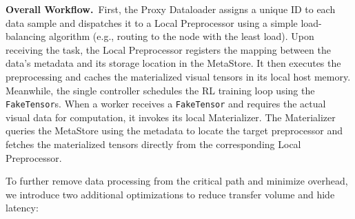 \noindent\textbf{Overall Workflow.}~First, the Proxy Dataloader assigns a unique ID to each data sample and dispatches it to a Local Preprocessor using a simple load-balancing algorithm (e.g., routing to the node with the least load). Upon receiving the task, the Local Preprocessor registers the mapping between the data's metadata and its storage location in the MetaStore. It then executes the preprocessing and caches the materialized visual tensors in its local host memory. Meanwhile, the single controller schedules the RL training loop using the \texttt{FakeTensor}s. When a worker receives a \texttt{FakeTensor} and requires the actual visual data for computation, it invokes its local Materializer. The Materializer queries the MetaStore using the metadata to locate the target preprocessor and fetches the materialized tensors directly from the corresponding Local Preprocessor.


To further remove data processing from the critical path and minimize overhead, we introduce two additional optimizations to reduce transfer volume and hide latency:

